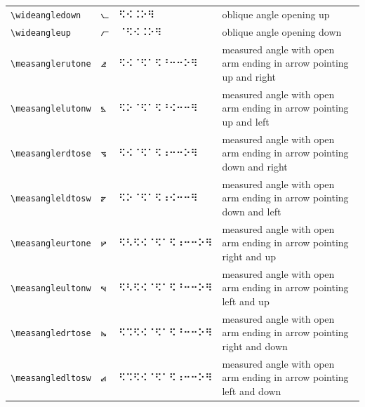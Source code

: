 \documentclass[oneside]{article}
\begin{document}
\begin{longtable}{llll}
\verb|\wideangledown| & $\wideangledown$ &  ⠫⠪⠨⠕⠻  & {oblique angle opening up} \\[2ex]
\verb|\wideangleup| & $\wideangleup$ &  ⠈⠫⠪⠨⠕⠻  & {oblique angle opening down} \\[2ex]
\verb|\measanglerutone| & $\measanglerutone$ &  ⠫⠪⠈⠫⠁⠫⠘⠒⠒⠕⠻  & \begin{minipage}[t]{8cm}{measured angle with open arm ending in arrow pointing up and right}
\end{minipage}\\[4ex]
\verb|\measanglelutonw| & $\measanglelutonw$ &  ⠫⠕⠈⠫⠁⠫⠘⠪⠒⠒⠻  & \begin{minipage}[t]{8cm}{measured angle with open arm ending in arrow pointing up and left}
\end{minipage}\\[4ex]
\verb|\measanglerdtose| & $\measanglerdtose$ &  ⠫⠪⠈⠫⠁⠫⠰⠒⠒⠕⠻  & \begin{minipage}[t]{8cm}{measured angle with open arm ending in arrow pointing down and right}
\end{minipage}\\[4ex]
\verb|\measangleldtosw| & $\measangleldtosw$ &  ⠫⠕⠈⠫⠁⠫⠰⠪⠒⠒⠻  & \begin{minipage}[t]{8cm}{measured angle with open arm ending in arrow pointing down and left}
\end{minipage}\\[4ex]
\verb|\measangleurtone| & $\measangleurtone$ &  ⠫⠣⠫⠪⠈⠫⠁⠫⠰⠒⠒⠕⠻  & \begin{minipage}[t]{8cm}{measured angle with open arm ending in arrow pointing right and up}
\end{minipage}\\[4ex]
\verb|\measangleultonw| & $\measangleultonw$ &  ⠫⠣⠫⠪⠈⠫⠁⠫⠘⠒⠒⠕⠻  & \begin{minipage}[t]{8cm}{measured angle with open arm ending in arrow pointing left and up}
\end{minipage}\\[4ex]
\verb|\measangledrtose| & $\measangledrtose$ &  ⠫⠩⠫⠪⠈⠫⠁⠫⠘⠒⠒⠕⠻  & \begin{minipage}[t]{8cm}{measured angle with open arm ending in arrow pointing right and down}
\end{minipage}\\[4ex]
\verb|\measangledltosw| & $\measangledltosw$ &  ⠫⠩⠫⠪⠈⠫⠁⠫⠰⠒⠒⠕⠻  & \begin{minipage}[t]{8cm}{measured angle with open arm ending in arrow pointing left and down}
\end{minipage}\\[4ex]

\end{longtable}
\end{document}
